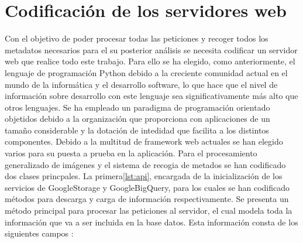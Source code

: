 \section{Codificación de los servidores web}\label{sec:codificación-de-los-servidores-web}
Con el objetivo de poder procesar todas las peticiones y recoger todos los metadatos necesarios para el su posterior análisis se necesita codificar un servidor web que realice todo este trabajo.
Para ello se ha elegido, como anteriormente, el lenguaje de programación Python debido a la creciente comunidad actual en el mundo de la informática y el desarrollo software, lo que hace que el nivel
de información sobre desarrollo con este lenguaje sea significativamente más alto que otros lenguajes.
Se ha empleado un paradigma de programación orientado objetidos debido a la organización que proporciona con aplicaciones de un tamaño considerable y la dotación de intedidad que facilita a los distintos
componentes.
Debido a la multitud de framework web actuales se han elegido varios para su puesta a prueba en la aplicación.
Para el procesamiento generalizado de imágenes y el sistema de recogia de metados se han codificado dos clases princpales.
La primera\ref{lst:api}, encargada de la inicialización de los servicios de GoogleStorage y GoogleBigQuery, para los cuales se han codificado métodos para descarga y carga de información respectivamente.
Se presenta un método principal para procesar las peticiones al servidor, el cual modela toda la información que va a ser incluida en la base datos.
Esta información consta de los siguientes campos :


